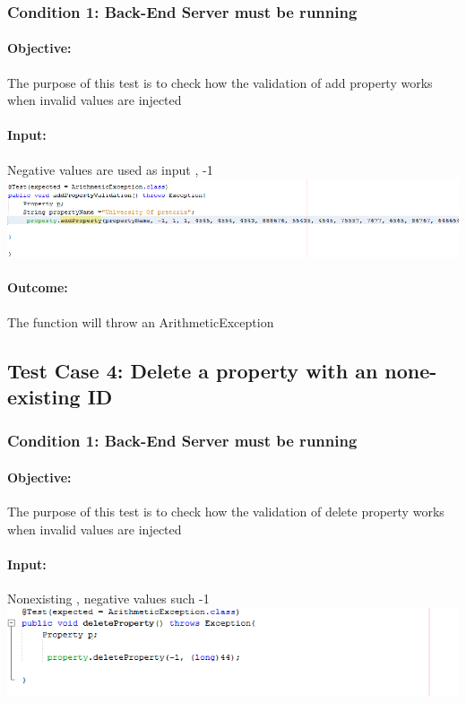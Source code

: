\documentclass[a4paper,12pt]{article}
\begin{document}
\subsubsection{Condition 1: Back-End Server must be running}
\paragraph{Objective:}The purpose of this test is to check how the validation of add property works when invalid values are injected 
\paragraph{Input:} Negative values are used as input , -1\\
\includegraphics[width=1\textwidth]{./Images/input3.png}

\paragraph{Outcome: } The function will throw an ArithmeticException

\subsection{Test Case 4: Delete a property with an none-existing ID}
\subsubsection{Condition 1: Back-End Server must be running}
\paragraph{Objective:}The purpose of this test is to check how the validation of delete property works when invalid values are injected 
\paragraph{Input:}Nonexisting , negative values such  -1\\
\includegraphics[width=1\textwidth]{./Images/input4.png}
\end{document}
